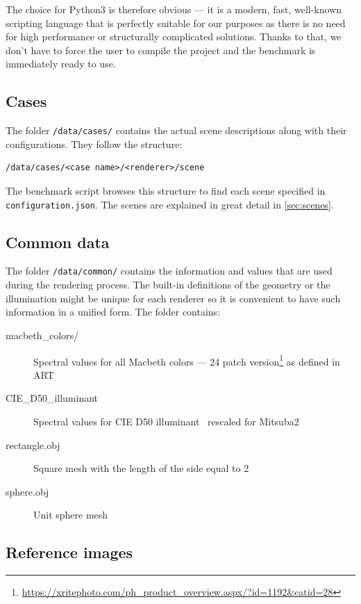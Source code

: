The choice for Python3 is therefore obvious --- it is a modern, fast, well-known scripting language that is perfectly suitable for our purposes as there is no need for high performance or structurally complicated solutions. Thanks to that, we don't have to force the user to compile the project and the benchmark is immediately ready to use.

\subsection{Cases}

The folder \texttt{/data/cases/} contains the actual scene descriptions along with their configurations. They follow the structure:

\begin{lstlisting}
/data/cases/<case name>/<renderer>/scene
\end{lstlisting}

The benchmark script browses this structure to find each scene specified in \texttt{configuration.json}. The scenes are explained in great detail in \autoref{sec:scenes}.

\subsection{Common data}

The folder \texttt{/data/common/} contains the information and values that are used during the rendering process. The built-in definitions of the geometry or the illumination might be unique for each renderer so it is convenient to have such information in a unified form. The folder contains:

\begin{description}
	\item[macbeth\_colors/] Spectral values for all Macbeth colors --- 24 patch version\footnote{\url{https://xritephoto.com/ph_product_overview.aspx/?id=1192&catid=28}} as defined in ART
	\item[CIE\_D50\_illuminant] Spectral values for CIE D50 illuminant~\cite{cieData} rescaled for Mitsuba2
	\item[rectangle.obj] Square mesh with the length of the side equal to 2
	\item[sphere.obj] Unit sphere mesh
\end{description}

\subsection{Reference images}

